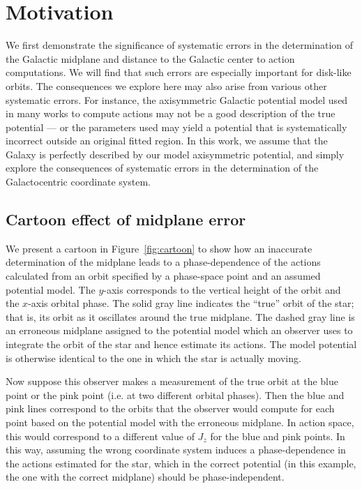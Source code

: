 \documentclass[twocolumn]{aastex62}
\begin{document}
\section{Motivation} \label{sec:ref_frame}
We first demonstrate the significance of systematic errors in the
determination of the Galactic midplane and distance to the Galactic center to
action computations. We will find that such errors are especially important
for disk-like orbits. The consequences we explore here may also arise from
various other systematic errors. For instance, the axisymmetric Galactic
potential model used in many works to compute actions may not be a good
description of the true potential --- or the parameters used may yield a
potential that is systematically incorrect outside an original fitted region.
In this work, we assume that the Galaxy is perfectly described by our model
axisymmetric potential, and simply explore the consequences of systematic
errors in the determination of the Galactocentric coordinate system.

\subsection{Cartoon effect of midplane error} \label{ssec:cartoon}
We present a cartoon in Figure~\ref{fig:cartoon} to show how an inaccurate
determination of the midplane leads to a phase-dependence of the actions
calculated from an orbit specified by a phase-space point and an assumed
potential model. The $y$-axis corresponds to the vertical height of the orbit
and the $x$-axis orbital phase. The solid gray line indicates the ``true''
orbit of the star; that is, its orbit as it oscillates around the true
midplane. The dashed gray line is an erroneous midplane assigned to the
potential model which an observer uses to integrate the orbit of the star and
hence estimate its actions. The model potential is otherwise identical to the
one in which the star is actually moving.

Now suppose this observer makes a measurement of the true orbit at the blue
point or the pink point (i.e. at two different orbital phases). Then the blue
and pink lines correspond to the orbits that the observer would compute for
each point based on the potential model with the erroneous midplane. In action
space, this would correspond to a different value of $J_z$ for the blue and
pink points. In this way, assuming the wrong coordinate system induces a
phase-dependence in the actions estimated for the star, which in the correct
potential (in this example, the one with the correct midplane) should be
phase-independent.
\end{document}
